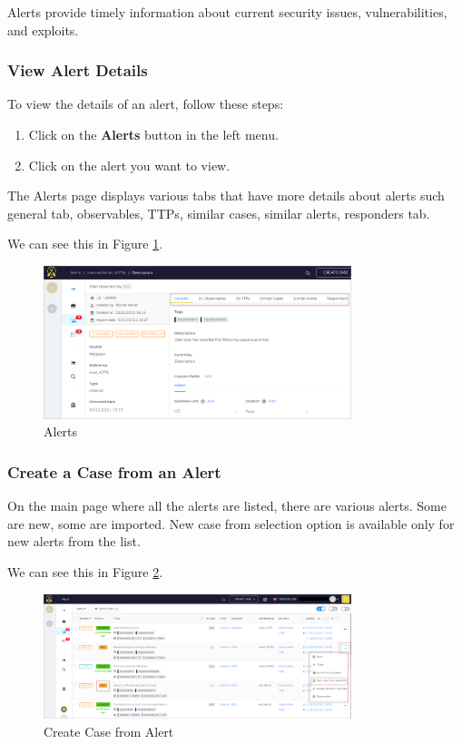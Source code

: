 \documentclass{article}
\begin{document}
Alerts provide timely information about current security issues, vulnerabilities, and exploits.

\subsubsection{View Alert Details}

To view the details of an alert, follow these steps:

\begin{enumerate}
  \item Click on the \textbf{Alerts} button in the left menu.
  \item Click on the alert you want to view.
\end{enumerate}

The Alerts page displays various tabs that have more details about alerts such general tab, observables, TTPs, similar cases, similar alerts, responders tab.

We can see this in Figure \ref{fig:alert}.

\begin{figure}[H]
    \centering
    \includegraphics[width=0.8\textwidth]{alerts-menu-list.png}
    \caption{Alerts}
    \label{fig:alert}
\end{figure}

\subsubsection{Create a Case from an Alert}

On the main page where all the alerts are listed, there are various alerts. Some are new, some are imported. New case from selection option is available only for new alerts from the list.

We can see this in Figure \ref{fig:case}.
\begin{figure}[H]
    \centering
    \includegraphics[width=0.8\textwidth]{alerts-actions1.png}
    \caption{Create Case from Alert}
    \label{fig:case}
\end{figure}
\end{document}
